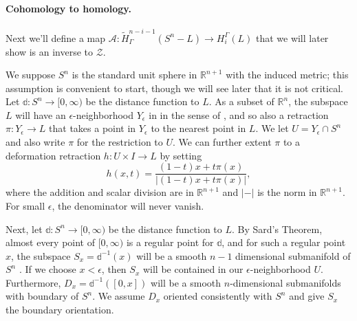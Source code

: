 \documentclass[12pt]{article}
\theoremstyle{plain}
\theoremstyle{definition}
\theoremstyle{remark}
\newcommand{\td}[1]{\tilde{#1}}
\newcommand{\R}{\mathbb{R}}
\newcommand{\mc}[1]{\mathcal{#1}}
\begin{document}
\paragraph{Cohomology to homology.} Next we'll define a map $\mc A \colon \td H^{n-i-1}_\Gamma(S^n-L) \to H_i^\Gamma(L)$ that we will later show is an inverse to $\mc Z$.

We suppose $S^n$ is the standard unit sphere in $\R^{n+1}$ with the induced metric; this assumption is convenient to start, though we will see later that it is not critical.
Let $\mathbb{d} \colon S^n \to [0,\infty)$ be the distance function to $L$.
As a subset of $\R^n$, the subspace $L$ will have an $\epsilon$-neighborhood $Y_\epsilon$ in in the sense of \cite[Section 2.3]{GuPo74}, and so also a retraction $\pi \colon Y_\epsilon \to L$ that takes a point in $Y_\epsilon$ to the nearest point in $L$.
We let $U = Y_\epsilon \cap S^n$ and also write $\pi$ for the restriction to $U$.
We can further extent $\pi$ to a deformation retraction $h \colon U \times I \to L$ by setting
$$h(x,t) = \frac{(1-t)x + t\pi(x)}{|(1-t)x + t\pi(x) |},$$
where the addition and scalar division are in $\R^{n+1}$ and $|-|$ is the norm in $\R^{n+1}$.
For small $\epsilon$, the denominator will never vanish.

Next, let $\mathbb{d} \colon S^n \to [0,\infty)$ be the distance function to $L$.
By Sard's Theorem, almost every point of $[0,\infty)$ is a regular point for $\mathbb{d}$, and for such a regular point $x$, the subspace $S_x = \mathbb{d}^{-1}(x)$ will be a smooth $n-1$ dimensional submanifold of $S^n$ \cite[Section 2.1]{GuPo74}.
If we choose $x < \epsilon$, then $S_x$ will be contained in our $\epsilon$-neighborhood $U$.
Furthermore, $D_x = \mathbb{d}^{-1}([0,x])$ will be a smooth $n$-dimensional submanifolds with boundary of $S^n$.
We assume $D_x$ oriented consistently with $S^n$ and give $S_x$ the boundary orientation.
\end{document}
